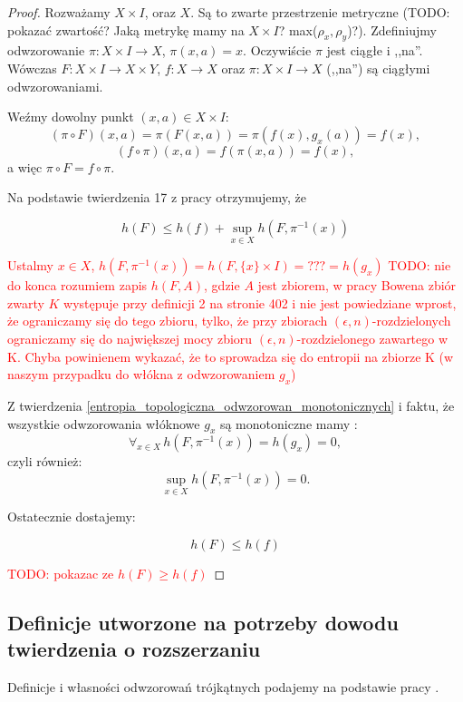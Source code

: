 \documentclass[licencjacka]{pwr_wmat_praca_dyplomowa}
\theoremstyle{plain}
\numberwithin{theorem}{chapter}
\theoremstyle{definition}
\numberwithin{theorem}{chapter}
\begin{document}
\begin{proof}

Rozważamy $X \times I$, oraz $X.$ Są to zwarte przestrzenie metryczne (TODO: pokazać zwartość? Jaką metrykę mamy na $X \times I$? max($\rho_x, \rho_y$)?).
Zdefiniujmy odwzorowanie $\pi: X \times I \rightarrow X$, $\pi(x,a) = x$. Oczywiście $\pi$ jest ciągłe i ,,na''.
Wówczas $F: X \times I \rightarrow X \times Y$, $f: X \rightarrow X$ oraz $\pi: X \times I \rightarrow X$ (,,na'') są ciągłymi odwzorowaniami. 

Weźmy dowolny punkt $(x, a) \in X \times I$:
$$(\pi \circ F)(x, a) = \pi(F(x,a)) = \pi(f(x), g_x(a)) = f(x),$$
$$(f \circ \pi)(x, a) = f(\pi(x,a)) = f(x),$$
a więc $\pi \circ F = f \circ \pi.$


Na podstawie twierdzenia 17 z pracy  \cite[s.~103]{bowen1971entropy__do_dowodu_rownosci_topologicznej_entropii_2_twierdzenie17} otrzymujemy, że 

$$h(F) \leq h(f) + \sup_{x \in X} h(F, \pi^{-1}(x))$$

\textcolor{red}{Ustalmy $x \in X$, $h(F, \pi^{-1}(x)) = h(F, \{x\} \times I) =???= h(g_x)$ TODO: nie do konca rozumiem zapis $h(F, A)$, gdzie $A$ jest zbiorem, w pracy Bowena zbiór zwarty $K$ występuje przy definicji 2 na stronie 402 i nie jest powiedziane wprost, że ograniczamy się do tego zbioru, tylko, że przy zbiorach $(\epsilon, n)$-rozdzielonych ograniczamy się do największej mocy zbioru $(\epsilon, n)$-rozdzielonego zawartego w K. Chyba powinienem wykazać, że to sprowadza się do entropii na zbiorze K (w naszym przypadku do włókna z odwzorowaniem $g_x$)}

Z twierdzenia \ref{entropia_topologiczna_odwzorowan_monotonicznych} i faktu, że wszystkie odwzorowania włóknowe $g_x$ są monotoniczne mamy :
$$\forall_{x \in X} \, h(F, \pi^{-1}(x)) = h(g_x) = 0,$$
czyli również:
$$\sup_{x \in X} h(F, \pi^{-1}(x)) = 0.$$

Ostatecznie dostajemy:

$$h(F) \leq h(f)$$

\textcolor{red}{TODO: pokazac ze $h(F) \geq h(f)$}

\end{proof}



\subsection{Definicje utworzone na potrzeby dowodu twierdzenia o rozszerzaniu}
Definicje i własności odwzorowań trójkątnych podajemy na podstawie pracy \cite{balibrea2003topological}.
\end{document}
